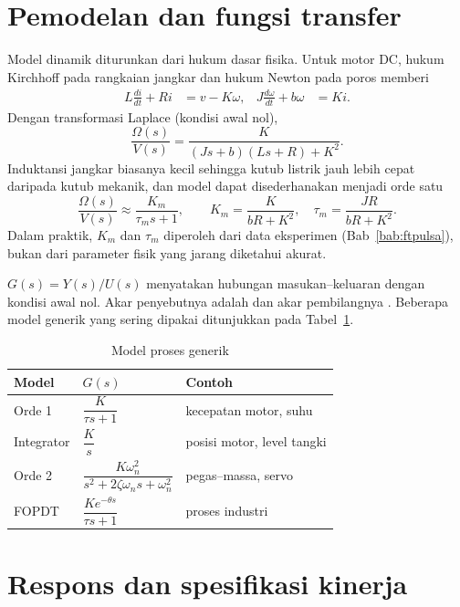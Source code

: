 \section{Pemodelan dan fungsi transfer}
Model dinamik diturunkan dari hukum dasar fisika. Untuk motor DC, hukum Kirchhoff pada rangkaian jangkar dan hukum Newton pada poros memberi
\begin{align}
	L\frac{di}{dt} + Ri &= v - K\omega, &
	J\frac{d\omega}{dt} + b\omega &= Ki .
\end{align}
Dengan transformasi Laplace (kondisi awal nol),
\begin{equation}
	\frac{\Omega(s)}{V(s)} = \frac{K}{(Js+b)(Ls+R)+K^2}.
\end{equation}
Induktansi jangkar biasanya kecil sehingga kutub listrik jauh lebih cepat daripada kutub mekanik, dan model dapat disederhanakan menjadi orde satu
\begin{equation}
	\frac{\Omega(s)}{V(s)} \approx \frac{K_m}{\tau_m s+1},\qquad K_m = \frac{K}{bR+K^2},\quad \tau_m = \frac{JR}{bR+K^2}.
\end{equation}
Dalam praktik, $K_m$ dan $\tau_m$ diperoleh dari data eksperimen (Bab~\ref{bab:ftpulsa}), bukan dari parameter fisik yang jarang diketahui akurat.

 $G(s) = Y(s)/U(s)$ menyatakan hubungan masukan--keluaran dengan kondisi awal nol. Akar penyebutnya adalah  dan akar pembilangnya . Beberapa model generik yang sering dipakai ditunjukkan pada Tabel~\ref{tab:b1-model}.

\begin{table}[H]
	\centering
	\caption{Model proses generik}
	\label{tab:b1-model}
	\renewcommand{\arraystretch}{2.0}
	\begin{tabular}{@{}l l l@{}}
		\toprule
		Model & $G(s)$ & Contoh \\
		\midrule
		Orde 1 & $\dfrac{K}{\tau s+1}$ & kecepatan motor, suhu \\
		Integrator & $\dfrac{K}{s}$ & posisi motor, level tangki \\
		Orde 2 & $\dfrac{K\omega_n^2}{s^2+2\zeta\omega_ns+\omega_n^2}$ & pegas--massa, servo \\
		FOPDT & $\dfrac{Ke^{-\theta s}}{\tau s+1}$ & proses industri \\
		\bottomrule
	\end{tabular}
\end{table}

\section{Respons dan spesifikasi kinerja}
